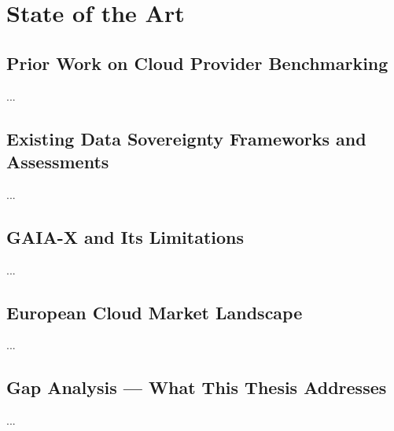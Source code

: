 \chapter{State of the Art}

\section{Prior Work on Cloud Provider Benchmarking}
...

\section{Existing Data Sovereignty Frameworks and Assessments}
...

\section{GAIA-X and Its Limitations}
...

\section{European Cloud Market Landscape}
...

\section{Gap Analysis — What This Thesis Addresses}
...